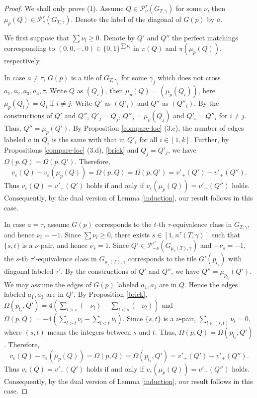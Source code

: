 \documentclass[10pt]{amsart}
\theoremstyle{theorems}
\begin{document}
\begin{proof}

We shall only prove (1). Assume $Q\in \mathcal P^{\tau}_{\nu}(G_{T,\gamma})$ for some $\nu$, then $\mu_{p}(Q)\in \mathcal P^{\tau}_{\nu}(G_{T,\gamma})$. Denote the label of the diagonal of $G(p)$ by $a$.

We first suppose that $\sum\nu_l\geq 0$. Denote by $Q'$ and $Q''$ the perfect matchings corresponding to $(0,0,\cdots,0)\in \{0,1\}^{\sum \nu_l}$ in $\pi(Q)$ and $\pi(\mu_p(Q))$, respectively.

In case $a\neq \tau$, $G(p)$ is a tile of $G_{T,\gamma_j}$ for some $\gamma_j$ which does not cross $a_1,a_2,a_3,a_4,\tau$. Write $Q$ as $(Q_i)$, then $\mu_{p}(Q)=(\mu_p(Q_i))$, here $\mu_p(Q_i)=Q_i$ if $i\neq j$. Write $Q'$ as $(Q'_i)$ and $Q''$ as $(Q''_i)$. By the constructions of $Q'$ and $Q''$, $Q'_j=Q_j$, $Q''_j=\mu_p(Q_j)$ and $Q'_i=Q''_i$ for $i\neq j$. Thus, $Q''=\mu_p(Q')$. By Proposition \ref{compare-loc} (3.c), the number of edges labeled $a$ in $Q_i$ is the same with that in $Q'_i$ for all $i\in [1,k]$. Further, by Propositions \ref{compare-loc} (3.d), \ref{brick} and $Q_j=Q'_j$, we have $\Omega(p,Q)=\Omega(p, Q')$. Therefore,
$$v_{\varepsilon}(Q)-v_{\varepsilon}(\mu_{p}(Q))=\Omega(p,Q)=\Omega(p,Q')=v'_{+}(Q')-v'_{+}(Q'').$$
Thus $v_{\varepsilon}(Q)=v'_{+}(Q')$ holds if and only if $v_{\varepsilon}(\mu_{p}(Q))=v'_{+}(Q'')$ holds. Consequently, by the dual version of Lemma \ref{induction}, our result follows in this case.

In case $a=\tau$, assume $G(p)$ corresponds to the $t$-th $\tau$-equivalence class in $G_{T,\gamma}$, and hence $\nu_t=-1$. Since $\sum\nu_l\geq 0$, there exists $s\in [1,n^{\tau}(T,\gamma)]$ such that $\{s,t\}$ is a $\nu$-pair, and hence $\nu_s=1$. Since $Q'\in \mathcal P^{\tau'}_{-\nu}(G_{\mu_{\tau}(T),\gamma})$ and $-\nu_s=-1$, the $s$-th $\tau'$-equivalence class in $G_{\mu_{\tau}(T),\gamma}$ corresponds to the tile $G'(p_{l_s})$ with diagonal labeled $\tau'$. By the constructions of $Q'$ and $Q''$, we have $Q''=\mu_{p_{l_s}}(Q')$. We may assume the edges of $G(p)$ labeled $a_1,a_3$ are in $Q$. Hence the edges labeled $a_1,a_3$ are in $Q'$. By Proposition \ref{brick}, $\Omega(p_{l_s},Q')=4(\sum_{l> s}(-\nu_l)-\sum_{l<s}(-\nu_l))$ and $\Omega(p,Q)=-4(\sum_{l> t}\nu_l-\sum_{l<t}\nu_l)$. Since $\{s,t\}$ is a $\nu$-pair, $\sum_{l\in (s,t)}\nu_l=0$, where $(s,t)$ means the integers between $s$ and $t$. Thus, $\Omega(p,Q)=\Omega(p_{l_s},Q')$. Therefore,
$$v_{\varepsilon}(Q)-v_{\varepsilon}(\mu_{p}(Q))=\Omega(p,Q)=\Omega(p_{l_s},Q')=v'_{+}(Q')-v'_{+}(Q'').$$
Thus $v_{\varepsilon}(Q)=v'_{+}(Q')$ holds if and only if $v_{\varepsilon}(\mu_{p}(Q))=v'_{+}(Q'')$ holds. Consequently, by the dual version of Lemma \ref{induction}, our result follows in this case.


\end{proof}
\end{document}
